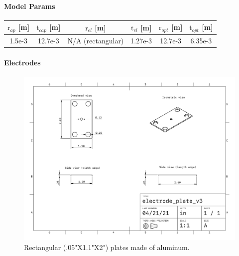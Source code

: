 \paragraph*{Model Params}\label{table:assembly2}
\begin{center}
\begin{tabular}{ |c|c|c|c|c|c| } 
\hline
$\mathrm{r}_{ap}$ [m] &  $\mathrm{t}_{cap}$ [m] & $\mathrm{r}_{el}$ [m] & $\mathrm{t}_{el}$ [m] & $\mathrm{r}_{opt}$ [m] & $\mathrm{t}_{opt}$ [m] \\
\hline
1.5e-3 & 12.7e-3 & N/A (rectangular) & 1.27e-3 & 12.7e-3 & 6.35e-3 \\ 
\hline
\end{tabular}
\end{center}

\paragraph*{Electrodes}

\begin{figure}[H]
  \centering
  \includegraphics[width=\textwidth]{figs/ALGAAS/assemblies/assembly2/assembly2_electrode.pdf}
  \caption{Rectangular (.05"X1.1"X2") plates made of aluminum.}
\end{figure}

\newpage

